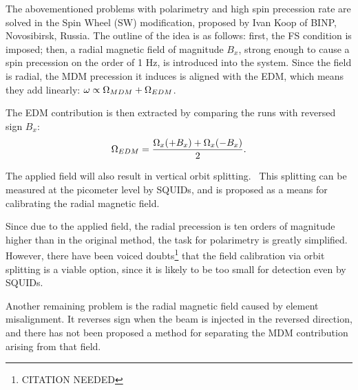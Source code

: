 \documentclass{article}
\begin{document}
The abovementioned problems with polarimetry and high spin precession rate are solved in the Spin Wheel (SW) modification, proposed by Ivan Koop of BINP, Novosibirsk, Russia. The outline of the idea is as follows: first, the FS condition is imposed; then, a radial magnetic field of magnitude $B_x$, strong enough to cause a spin precession on the order of 1 Hz, is introduced into the system. Since the field is radial, the MDM precession it induces is aligned with the EDM, which means they add linearly: $\omega \propto \Omega_{MDM} + \Omega_{EDM}$.

The EDM contribution is then extracted by comparing the runs with reversed sign $B_x$:~\citep[p.~1963]{Koop:IPAC13}
\[
\Omega_{EDM} = \frac{\Omega_x(+B_x) + \Omega_x(-B_x)}{2}.
\]

The applied field will also result in vertical orbit splitting.~\citep[p.~1963]{Koop:IPAC13} This splitting can be measured at the picometer level by SQUIDs, and is proposed as a means for calibrating the radial magnetic field.

Since due to the applied field, the radial precession is ten orders of magnitude higher than in the original method, the task for polarimetry is greatly simplified. However, there have been voiced doubts\footnote{CITATION NEEDED} that the field calibration via orbit splitting is a viable option, since it is likely to be too small for detection even by SQUIDs.


Another remaining problem is the radial magnetic field caused by element misalignment. It reverses sign when the beam is injected in the reversed direction, and there has not been proposed a method for separating the MDM contribution arising from that field.
\end{document}
